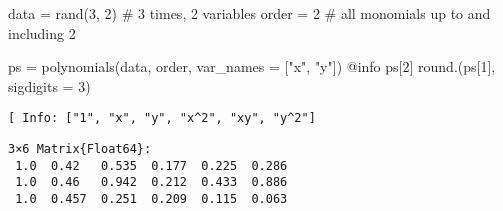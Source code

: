 \documentclass[
]{article}
\newenvironment{Shaded}{\begin{snugshade}}{\end{snugshade}}
\newcommand{\CommentTok}[1]{\textcolor[rgb]{0.37,0.37,0.37}{#1}}
\newcommand{\FloatTok}[1]{\textcolor[rgb]{0.68,0.00,0.00}{#1}}
\newcommand{\FunctionTok}[1]{\textcolor[rgb]{0.28,0.35,0.67}{#1}}
\newcommand{\NormalTok}[1]{\textcolor[rgb]{0.00,0.23,0.31}{#1}}
\newcommand{\OperatorTok}[1]{\textcolor[rgb]{0.37,0.37,0.37}{#1}}
\newcommand{\PreprocessorTok}[1]{\textcolor[rgb]{0.68,0.00,0.00}{#1}}
\newcommand{\StringTok}[1]{\textcolor[rgb]{0.13,0.47,0.30}{#1}}
\begin{document}
\begin{Shaded}
\begin{Highlighting}[]
\NormalTok{data }\OperatorTok{=} \FunctionTok{rand}\NormalTok{(}\FloatTok{3}\NormalTok{,  }\FloatTok{2}\NormalTok{) }\CommentTok{\# 3 times, 2 variables}
\NormalTok{order }\OperatorTok{=} \FloatTok{2} \CommentTok{\# all monomials up to and including 2}

\NormalTok{ps }\OperatorTok{=} \FunctionTok{polynomials}\NormalTok{(data, order, var\_names }\OperatorTok{=}\NormalTok{ [}\StringTok{"x"}\NormalTok{, }\StringTok{"y"}\NormalTok{])}
\PreprocessorTok{@info}\NormalTok{ ps[}\FloatTok{2}\NormalTok{]}
\FunctionTok{round}\NormalTok{.(ps[}\FloatTok{1}\NormalTok{], sigdigits }\OperatorTok{=} \FloatTok{3}\NormalTok{)}
\end{Highlighting}
\end{Shaded}

\begin{verbatim}
[ Info: ["1", "x", "y", "x^2", "xy", "y^2"]
\end{verbatim}

\begin{verbatim}
3×6 Matrix{Float64}:
 1.0  0.42   0.535  0.177  0.225  0.286
 1.0  0.46   0.942  0.212  0.433  0.886
 1.0  0.457  0.251  0.209  0.115  0.063
\end{verbatim}

\clearpage
\end{document}

